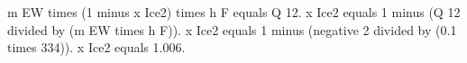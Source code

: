 m EW times (1 minus x Ice2) times h F equals Q 12.  
x Ice2 equals 1 minus (Q 12 divided by (m EW times h F)).  
x Ice2 equals 1 minus (negative 2 divided by (0.1 times 334)).  
x Ice2 equals 1.006.